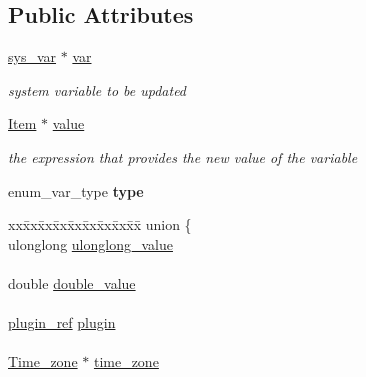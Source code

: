 \subsection*{Public Attributes}
\begin{DoxyCompactItemize}
\item 
\mbox{\label{classset__var_aba70504fbb23bc6f80b28a57a7fbc99d}} 
\mbox{\hyperlink{classsys__var}{sys\+\_\+var}} $\ast$ \mbox{\hyperlink{classset__var_aba70504fbb23bc6f80b28a57a7fbc99d}{var}}
\begin{DoxyCompactList}\small\item\em system variable to be updated \end{DoxyCompactList}\item 
\mbox{\label{classset__var_ab1f27659e7ce12be2f8abfa4c5b69458}} 
\mbox{\hyperlink{classItem}{Item}} $\ast$ \mbox{\hyperlink{classset__var_ab1f27659e7ce12be2f8abfa4c5b69458}{value}}
\begin{DoxyCompactList}\small\item\em the expression that provides the new value of the variable \end{DoxyCompactList}\item 
\mbox{\label{classset__var_add694599300d0ee023cac5452b2136c8}} 
enum\+\_\+var\+\_\+type {\bfseries type}
\item 
\mbox{\label{classset__var_ac8e598c78fde147e6de8b50f59d2d354}} 
\begin{tabbing}
xx\=xx\=xx\=xx\=xx\=xx\=xx\=xx\=xx\=\kill
union \{\\
\>ulonglong \mbox{\hyperlink{classset__var_a17e98a0d6265ac6fb52bfa48f656947e}{ulonglong\_value}}\\
\>\\
\>double \mbox{\hyperlink{classset__var_af84f10f97ad46414f06ebef7dfe16aff}{double\_value}}\\
\>\\
\>\mbox{\hyperlink{structst__plugin__int}{plugin\_ref}} \mbox{\hyperlink{classset__var_aed7461aa3c341175e4e5d53c837eaffb}{plugin}}\\
\>\\
\>\mbox{\hyperlink{classTime__zone}{Time\_zone}} $\ast$ \mbox{\hyperlink{classset__var_a94fd170b341a605b9486b650f85d95b5}{time\_zone}}\\

\end{tabbing}
\end{DoxyCompactItemize}
